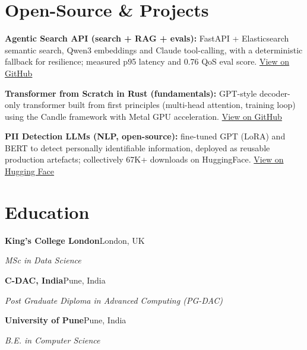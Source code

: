 \documentclass[10pt,a4paper]{article}
\begin{document}
\section{Open-Source \& Projects}
\begin{tight}
  \item \textbf{Agentic Search API (search + RAG + evals):} FastAPI + Elasticsearch semantic search, Qwen3 embeddings and Claude tool-calling, with a deterministic fallback for resilience; measured p95 latency and 0.76 QoS eval score. \href{https://github.com/abhijeetscode/search-agent}{View on GitHub}
  \item \textbf{Transformer from Scratch in Rust (fundamentals):} GPT-style decoder-only transformer built from first principles (multi-head attention, training loop) using the Candle framework with Metal GPU acceleration. \href{https://github.com/abhijeetscode/transformer-rust}{View on GitHub}
  \item \textbf{PII Detection LLMs (NLP, open-source):} fine-tuned GPT (LoRA) and BERT to detect personally identifiable information, deployed as reusable production artefacts; collectively 67K+ downloads on HuggingFace. \href{https://huggingface.co/ab-ai/pii_model}{View on Hugging Face}
\end{tight}

\section{Education}
{\color{company}\bfseries King's College London}\hfill {\color{muted}London, UK}\par
{\itshape MSc in Data Science}\par\vspace{2pt}
{\color{company}\bfseries C-DAC, India}\hfill {\color{muted}Pune, India}\par
{\itshape Post Graduate Diploma in Advanced Computing (PG-DAC)}\par\vspace{2pt}
{\color{company}\bfseries University of Pune}\hfill {\color{muted}Pune, India}\par
{\itshape B.E. in Computer Science}\par
\end{document}
